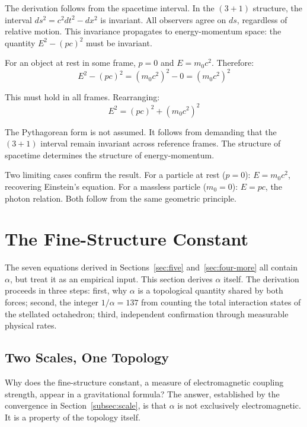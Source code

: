 \documentclass[aps,prd,preprint,superscriptaddress,showpacs,preprintnumbers,amsmath,amssymb,nofootinbib]{revtex4-2}
\begin{document}
The derivation follows from the spacetime interval. In the $(3+1)$ structure, the interval $ds^2 = c^2 dt^2 - dx^2$ is invariant. All observers agree on $ds$, regardless of relative motion. This invariance propagates to energy-momentum space: the quantity $E^2 - (pc)^2$ must be invariant.

For an object at rest in some frame, $p = 0$ and $E = m_0 c^2$. Therefore:
\begin{equation}
E^2 - (pc)^2 = (m_0 c^2)^2 - 0 = (m_0 c^2)^2
\end{equation}

This must hold in all frames. Rearranging:
\begin{equation}
E^2 = (pc)^2 + (m_0 c^2)^2
\end{equation}

The Pythagorean form is not assumed. It follows from demanding that the $(3+1)$ interval remain invariant across reference frames. The structure of spacetime determines the structure of energy-momentum.

Two limiting cases confirm the result. For a particle at rest ($p = 0$): $E = m_0 c^2$, recovering Einstein's equation. For a massless particle ($m_0 = 0$): $E = pc$, the photon relation. Both follow from the same geometric principle.

\section{The Fine-Structure Constant}
\label{sec:alpha}

The seven equations derived in Sections~\ref{sec:five} and~\ref{sec:four-more} all contain $\alpha$, but treat it as an empirical input. This section derives $\alpha$ itself. The derivation proceeds in three steps: first, why $\alpha$ is a topological quantity shared by both forces; second, the integer $1/\alpha = 137$ from counting the total interaction states of the stellated octahedron; third, independent confirmation through measurable physical rates.

\subsection{Two Scales, One Topology}
\label{subsec:alpha-scale}

Why does the fine-structure constant, a measure of electromagnetic coupling strength, appear in a gravitational formula? The answer, established by the convergence in Section~\ref{subsec:scale}, is that $\alpha$ is not exclusively electromagnetic. It is a property of the topology itself.
\end{document}
